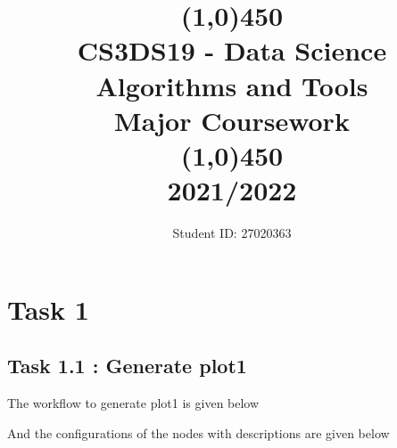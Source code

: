 \documentclass[11pt]{article}
\title{\line(1,0){450}\\ CS3DS19 - Data Science Algorithms and Tools \\ \large{Major Coursework }  \\\line(1,0){450} \\2021/2022}
\author{Student ID: 27020363}
\begin{document}
	\maketitle
	\pagebreak
	
	\section*{Task 1}
		\subsection*{Task 1.1 : Generate plot1}
			The workflow to generate plot1 is given below

			And the configurations of the nodes with descriptions are given below
			\iffalse
\end{document}
